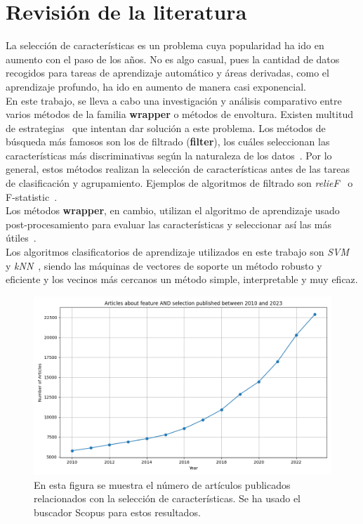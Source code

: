 \chapter{Revisión de la literatura}
La selección de características es un problema cuya popularidad ha ido en aumento con el paso de los años. No es algo casual, pues la cantidad de datos recogidos para tareas de aprendizaje automático y áreas derivadas, como el aprendizaje profundo, ha ido en aumento de manera casi exponencial.\\[6pt]
En este trabajo, se lleva a cabo una investigación y análisis comparativo entre varios métodos
de la familia \textbf{wrapper} o métodos de envoltura. Existen multitud de estrategias~\cite{miao_survey_2016}
que intentan dar solución a este problema. Los métodos de búsqueda más famosos son los de filtrado
(\textbf{filter}), los cuáles seleccionan las características más discriminativas según la naturaleza de los datos~\cite{miao_survey_2016}.
Por lo general, estos métodos realizan la selección de características antes de las tareas de clasificación y
agrupamiento. Ejemplos de algoritmos de filtrado son \textit{relieF}~\cite{kira_practical_1992} o F-statistic~\cite{ding_minimum_2005}.\\[6pt]
Los métodos \textbf{wrapper}, en cambio, utilizan el algoritmo de aprendizaje usado post-procesamiento
para evaluar las características y seleccionar así las más útiles~\cite{miao_survey_2016}.\\[6pt]
Los algoritmos clasificatorios de aprendizaje utilizados en este trabajo son \textit{SVM}~\cite{cortes_support-vector_1995}
y \textit{kNN}~\cite{fix_discriminatory_1989,cover_nearest_1967}, siendo las máquinas de vectores de
soporte un método robusto y eficiente y los vecinos más cercanos un método simple, interpretable
y muy eficaz.

\begin{figure}[htp]
  \begin{center}
    \includegraphics[width=1\textwidth]{imagenes/scopus_chart.png}
  \end{center}
  \caption[Popularidad de feature selection sobre los años]{En esta figura se muestra el número de artículos publicados relacionados con la selección de características. Se ha usado el buscador Scopus para estos resultados.}
  \label{fig:pop_fs}
\end{figure}

